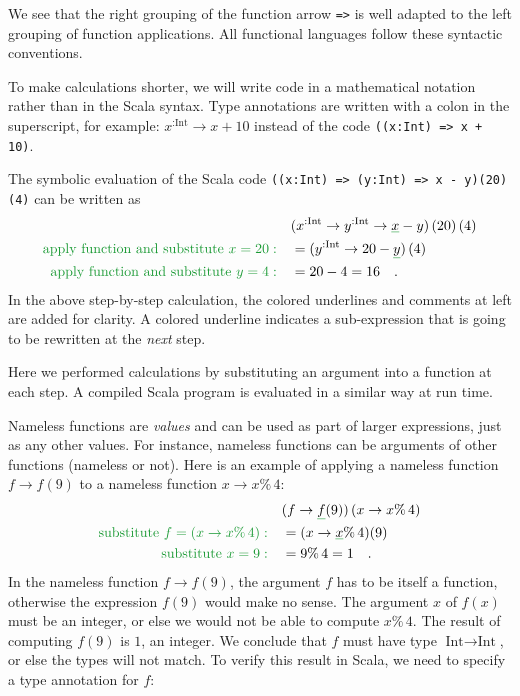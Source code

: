 We see that the right grouping of the function arrow \lstinline!=>!
is well adapted to the left grouping of function applications. All
functional languages follow these syntactic conventions.

To make calculations shorter, we will write code in a mathematical
notation rather than in the Scala syntax. Type annotations are written
with a colon in the superscript, for example: $x^{:\text{Int}}\rightarrow x+10$
instead of the code \lstinline!((x:Int) => x + 10)!.

The symbolic evaluation of the Scala code \lstinline!((x:Int) => (y:Int) => x - y)(20)(4)!
can be written as
\begin{align*}
 & (x^{:\text{Int}}\rightarrow y^{:\text{Int}}\rightarrow\gunderline x-y)\left(20\right)\left(4\right)\\
{\color{greenunder}\text{apply function and substitute }x=20:}\quad & =(y^{:\text{Int}}\rightarrow20-\gunderline y)\left(4\right)\\
{\color{greenunder}\text{apply function and substitute }y=4:}\quad & =20-4=16\quad.
\end{align*}
In the above step-by-step calculation, the colored underlines and
comments at left are added for clarity. A colored underline indicates
a sub-expression that is going to be rewritten at the \emph{next}
step.

Here we performed calculations by substituting an argument into a
function at each step. A compiled Scala program is evaluated in a
similar way at run time.

Nameless functions are \emph{values} and can be used as part of larger
expressions, just as any other values. For instance, nameless functions
can be arguments of other functions (nameless or not). Here is an
example of applying a nameless function $f\rightarrow f(9)$ to a
nameless function $x\rightarrow x\%\,4$:
\begin{align*}
 & (f\rightarrow\gunderline f(9))\left(x\rightarrow x\%\,4\right)\\
{\color{greenunder}\text{substitute }f=\left(x\rightarrow x\%\,4\right):}\quad & =(x\rightarrow\gunderline x\%\,4)(9)\\
{\color{greenunder}\text{substitute }x=9:}\quad & =9\%\,4=1\quad.
\end{align*}
In the nameless function $f\rightarrow f(9)$, the argument $f$ has
to be itself a function, otherwise the expression $f(9)$ would make
no sense. The argument $x$ of $f(x)$ must be an integer, or else
we would not be able to compute $x\%\,4$. The result of computing
$f(9)$ is $1$, an integer. We conclude that $f$ must have type
$\text{Int}\rightarrow\text{Int}$, or else the types will not match.
To verify this result in Scala, we need to specify a type annotation
for $f$:

